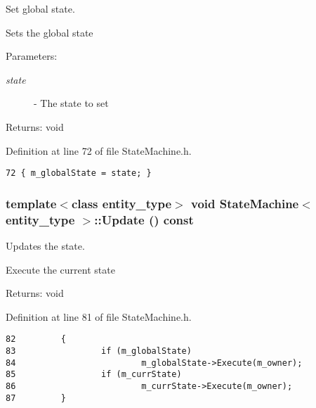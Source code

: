 Set global state. 

Sets the global state

\begin{Desc}
\item[Parameters:]
\begin{description}
\item[{\em state}]- The state to set\end{description}
\end{Desc}
\begin{Desc}
\item[Returns:]void \end{Desc}


Definition at line 72 of file StateMachine.h.

\begin{Code}\begin{verbatim}72 { m_globalState = state; }
\end{verbatim}
\end{Code}


\hypertarget{class_state_machine_24b1f38171537058ab8040b3b42adb6c}{
\subsubsection[Update]{\setlength{\rightskip}{0pt plus 5cm}template$<$class entity\_\-type$>$ void {\bf StateMachine}$<$ entity\_\-type $>$::Update () const}}
\label{class_state_machine_24b1f38171537058ab8040b3b42adb6c}


Updates the state. 

Execute the current state

\begin{Desc}
\item[Returns:]void \end{Desc}


Definition at line 81 of file StateMachine.h.

\begin{Code}\begin{verbatim}82         {
83                 if (m_globalState)
84                         m_globalState->Execute(m_owner);
85                 if (m_currState)
86                         m_currState->Execute(m_owner);
87         }
\end{verbatim}
\end{Code}


